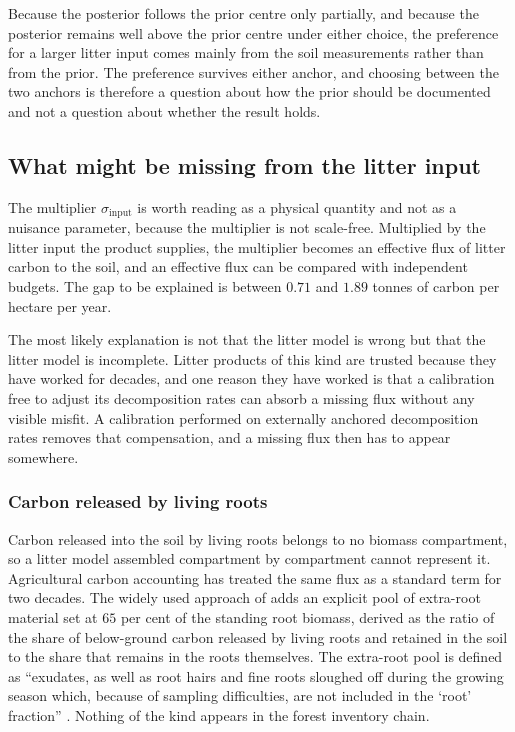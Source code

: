 \documentclass[11pt]{article}
\begin{document}
Because the posterior follows the prior centre only partially, and because the
posterior remains well above the prior centre under either choice, the preference for
a larger litter input comes mainly from the soil measurements rather than from the
prior. The preference survives either anchor, and choosing between
the two anchors is therefore a question about how the prior should be documented and
not a question about whether the result holds.


\subsection{What might be missing from the litter input}


The multiplier $\sigma_{\mathrm{input}}$ is worth reading as a physical quantity and
not as a nuisance parameter, because the multiplier is not scale-free. Multiplied by
the litter input the product supplies, the multiplier becomes an effective flux of
litter carbon to the soil, and an effective flux can be compared with independent
budgets. The gap to be explained is between $0.71$ and $1.89$ tonnes of carbon per
hectare per year.

The most likely explanation is not that the litter model is wrong but that the
litter model is incomplete. Litter products of this kind are trusted because they
have worked for decades, and one reason they have worked is that a calibration free
to adjust its decomposition rates can absorb a missing flux without any visible
misfit. A calibration performed on externally anchored decomposition rates removes
that compensation, and a missing flux then has to appear somewhere.

\subsubsection{Carbon released by living roots}

Carbon released into the soil by living roots belongs to no biomass compartment, so
a litter model assembled compartment by compartment cannot represent it. Agricultural
carbon accounting has treated the same flux as a standard term for two decades. The
widely used approach of \citet{Bolinder2007} adds an explicit pool of extra-root
material set at $65$ per cent of the standing root biomass, derived as the ratio of
the share of below-ground carbon released by living roots and retained in the soil
to the share that remains in the roots themselves. The extra-root pool is defined as
``exudates, as well as root hairs and fine roots sloughed off during the growing
season which, because of sampling difficulties, are not included in the `root'
fraction'' \citep{Bolinder2007}. Nothing of the kind appears in the forest inventory
chain.
\end{document}
